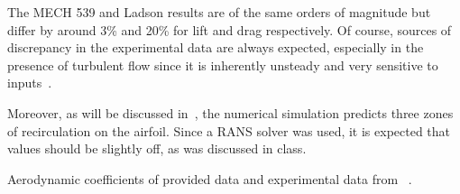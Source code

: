 The MECH 539 and Ladson results are of the same orders of magnitude but differ by around
3\% and 20\% for lift and drag respectively. Of course, sources of discrepancy in
the experimental data are always expected, especially in the presence of turbulent flow
since it is inherently unsteady and very sensitive to inputs~\cite{pope}.

Moreover, as will be discussed in~, the numerical simulation predicts
three zones of recirculation on the airfoil. Since a RANS solver was used, it is expected
that values should be slightly off, as was discussed in class.
\begin{table}
    \centering
    \caption{Aerodynamic coefficients of provided data and experimental data from
        ~\cite{ladson1988effects}.}
    \label{tab:aero}
    
\end{table}
